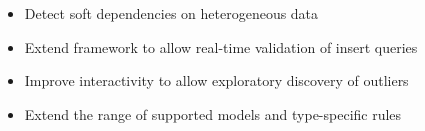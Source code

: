 \begin{block}{}
\begin{itemize}
\item Detect soft dependencies on heterogeneous data
\item Extend framework to allow real-time validation of insert queries
\item Improve interactivity to allow exploratory discovery of outliers 
\item Extend the range of supported models and type-specific rules
\end{itemize}
\end{block}
